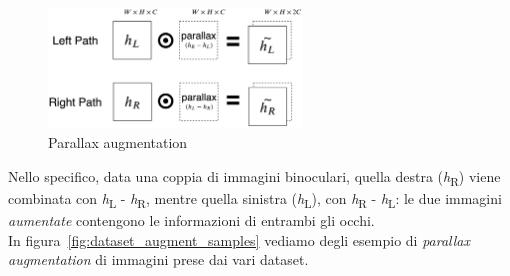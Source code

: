 \documentclass[italian,12pt,a4paper,oneside,final]{report}
\begin{document}
\begin{figure}[!ht]
	\centering
	\includegraphics[width=0.6\textwidth]{parallax.png}
	\caption{Parallax augmentation}
	\label{fig:cnn2_parallax}
\end{figure}

Nello specifico, data una coppia di immagini binoculari, quella destra (\textit{h}\textsubscript{R}) viene combinata con \textit{h}\textsubscript{L} - \textit{h}\textsubscript{R}, mentre quella sinistra (\textit{h}\textsubscript{L}), con \textit{h}\textsubscript{R} - \textit{h}\textsubscript{L}: le due immagini \textit{aumentate} contengono le informazioni di entrambi gli occhi. \\
In figura~\ref{fig:dataset_augment_samples} vediamo degli esempio di \textit{parallax augmentation} di immagini prese dai vari dataset.
\end{document}
